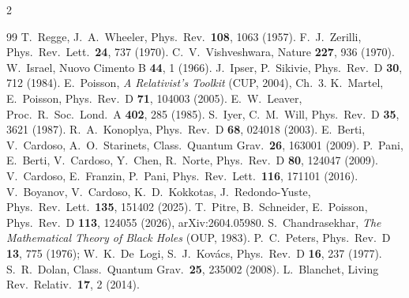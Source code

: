 \documentclass[10pt,a4paper]{article}
\begin{document}
\vspace{-2mm}
{\footnotesize
\begin{multicols}{2}
\begin{thebibliography}{99}\setlength{\itemsep}{0pt}
 T.~Regge, J.~A.~Wheeler, Phys.\ Rev.\ \textbf{108}, 1063 (1957).
 F.~J.~Zerilli, Phys.\ Rev.\ Lett.\ \textbf{24}, 737 (1970).
 C.~V.~Vishveshwara, Nature \textbf{227}, 936 (1970).
 W.~Israel, Nuovo Cimento B \textbf{44}, 1 (1966).
 J.~Ipser, P.~Sikivie, Phys.\ Rev.\ D \textbf{30}, 712 (1984).
 E.~Poisson, \emph{A Relativist's Toolkit} (CUP, 2004), Ch.~3.
 K.~Martel, E.~Poisson, Phys.\ Rev.\ D \textbf{71}, 104003 (2005).
 E.~W.~Leaver, Proc.\ R.\ Soc.\ Lond.\ A \textbf{402}, 285 (1985).
 S.~Iyer, C.~M.~Will, Phys.\ Rev.\ D \textbf{35}, 3621 (1987).
 R.~A.~Konoplya, Phys.\ Rev.\ D \textbf{68}, 024018 (2003).
 E.~Berti, V.~Cardoso, A.~O.~Starinets, Class.\ Quantum Grav.\ \textbf{26}, 163001 (2009).
 P.~Pani, E.~Berti, V.~Cardoso, Y.~Chen, R.~Norte, Phys.\ Rev.\ D \textbf{80}, 124047 (2009).
 V.~Cardoso, E.~Franzin, P.~Pani, Phys.\ Rev.\ Lett.\ \textbf{116}, 171101 (2016).
 V.~Boyanov, V.~Cardoso, K.~D.~Kokkotas, J.~Redondo-Yuste, Phys.\ Rev.\ Lett.\ \textbf{135}, 151402 (2025).
 T.~Pitre, B.~Schneider, E.~Poisson, Phys.\ Rev.\ D \textbf{113}, 124055 (2026), arXiv:2604.05980.
 S.~Chandrasekhar, \emph{The Mathematical Theory of Black Holes} (OUP, 1983).
 P.~C.~Peters, Phys.\ Rev.\ D \textbf{13}, 775 (1976); W.~K.~De~Logi, S.~J.~Kov\'acs, Phys.\ Rev.\ D \textbf{16}, 237 (1977).
 S.~R.~Dolan, Class.\ Quantum Grav.\ \textbf{25}, 235002 (2008).
 L.~Blanchet, Living Rev.\ Relativ.\ \textbf{17}, 2 (2014).
\end{thebibliography}
\end{multicols}}
\end{document}
